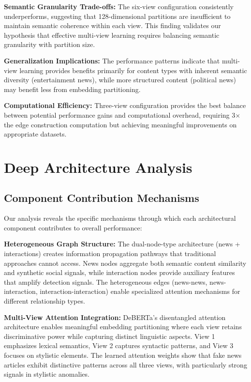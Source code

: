\textbf{Semantic Granularity Trade-offs:} The six-view configuration consistently underperforms, suggesting that 128-dimensional partitions are insufficient to maintain semantic coherence within each view. This finding validates our hypothesis that effective multi-view learning requires balancing semantic granularity with partition size.

\textbf{Generalization Implications:} The performance patterns indicate that multi-view learning provides benefits primarily for content types with inherent semantic diversity (entertainment news), while more structured content (political news) may benefit less from embedding partitioning.

\textbf{Computational Efficiency:} Three-view configuration provides the best balance between potential performance gains and computational overhead, requiring 3× the edge construction computation but achieving meaningful improvements on appropriate datasets.

\section{Deep Architecture Analysis}

\subsection{Component Contribution Mechanisms}

Our analysis reveals the specific mechanisms through which each architectural component contributes to overall performance:

\textbf{Heterogeneous Graph Structure:} The dual-node-type architecture (news + interactions) creates information propagation pathways that traditional approaches cannot access. News nodes aggregate both semantic content similarity and synthetic social signals, while interaction nodes provide auxiliary features that amplify detection signals. The heterogeneous edges (news-news, news-interaction, interaction-interaction) enable specialized attention mechanisms for different relationship types.

\textbf{Multi-View Attention Integration:} DeBERTa's disentangled attention architecture enables meaningful embedding partitioning where each view retains discriminative power while capturing distinct linguistic aspects. View 1 emphasizes lexical semantics, View 2 captures syntactic patterns, and View 3 focuses on stylistic elements. The learned attention weights show that fake news articles exhibit distinctive patterns across all three views, with particularly strong signals in stylistic anomalies.

